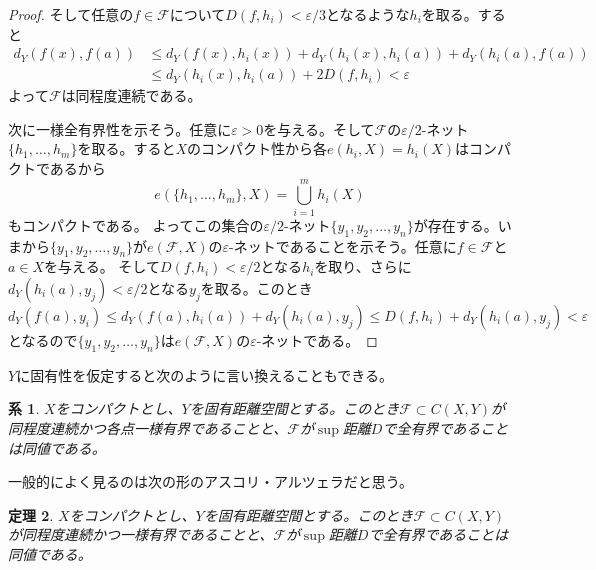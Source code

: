 \documentclass[leqno]{jsarticle}
\newtheorem{thm}{定理}
\newtheorem{cor}[thm]{系}
\newcommand{\ep}{\varepsilon}
\begin{document}
\begin{proof}
そして任意の$f\in \mathcal{F}$について$D(f,h_i)<\ep/3$となるような$h_i$を取る。すると
\begin{align*}
d_Y(f(x),f(a))&\le d_Y(f(x),h_i(x))+d_Y(h_i(x),h_i(a))+d_Y(h_i(a),f(a))\\
&\le d_Y(h_i(x),h_i(a))+2D(f,h_i)<\ep
\end{align*}
よって$\mathcal{F}$は同程度連続である。
\par
次に一様全有界性を示そう。任意に$\ep>0$を与える。そして$\mathcal{F}$の$\ep/2$-ネット$\{h_1,\dots,h_m\}$を取る。すると$X$のコンパクト性から各$e(h_i,X)=h_i(X)$はコンパクトであるから
\[
e(\{h_1,\dots,h_m\},X)=\bigcup_{i=1}^mh_i(X)
\]
もコンパクトである。
よってこの集合の$\ep/2$-ネット$\{y_{1}, y_{2},\dots, y_{n}\}$が存在する。いまから$\{y_{1}, y_{2},\dots, y_{n}\}$が$e(\mathcal{F},X)$の$\ep$-ネットであることを示そう。任意に$f\in \mathcal{F}$と$a\in X$を与える。
そして$D(f,h_i)<\ep/2$となる$h_i$を取り、さらに$d_Y(h_i(a),y_j)<\ep/2$となる$y_j$を取る。このとき
\[
d_Y(f(a), y_i)\le d_Y(f(a),h_i(a))+d_Y(h_i(a),y_j)\le D(f,h_i)+d_Y(h_i(a),y_j)<\ep
\]
となるので$\{y_{1}, y_{2},\dots, y_{n}\}$は$e(\mathcal{F},X)$の$\ep$-ネットである。
\end{proof}
$Y$に固有性を仮定すると次のように言い換えることもできる。
\begin{cor}
$X$をコンパクトとし、$Y$を固有距離空間とする。このとき$\mathcal{F}\subset C(X,Y)$が同程度連続かつ各点一様有界であることと、$\mathcal{F}$が$\sup$距離$D$で全有界であることは同値である。
\end{cor}
一般的によく見るのは次の形のアスコリ・アルツェラだと思う。
\begin{thm}
$X$をコンパクトとし、$Y$を固有距離空間とする。このとき$\mathcal{F}\subset C(X,Y)$が同程度連続かつ一様有界であることと、$\mathcal{F}$が$\sup$距離$D$で全有界であることは同値である。
\end{thm}
\end{document}
